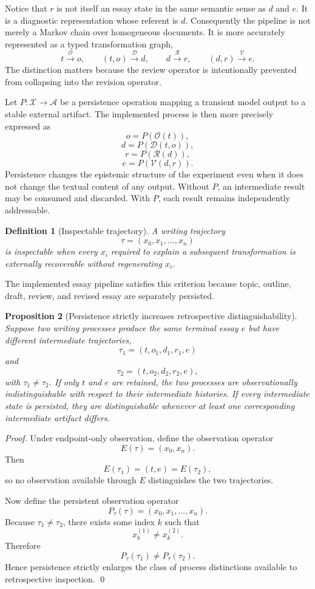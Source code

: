 \documentclass[11pt]{article}
\newtheorem{definition}{Definition}[section]
\newtheorem{proposition}[definition]{Proposition}
\newcommand{\Draft}{\mathcal{D}}
\newcommand{\Review}{\mathcal{R}}
\newcommand{\Revise}{\mathcal{V}}
\newcommand{\Outline}{\mathcal{O}}
\newcommand{\Artifact}{\mathcal{A}}
\begin{document}
Notice that \(r\) is not itself an essay state in the same semantic sense as \(d\) and \(e\). It is a diagnostic representation whose referent is \(d\). Consequently the pipeline is not merely a Markov chain over homogeneous documents. It is more accurately represented as a typed transformation graph,
\[
t \xrightarrow{\Outline} o,
\qquad
(t,o)\xrightarrow{\Draft}d,
\qquad
d\xrightarrow{\Review}r,
\qquad
(d,r)\xrightarrow{\Revise}e.
\]
The distinction matters because the review operator is intentionally prevented from collapsing into the revision operator.

Let \(P:\mathcal{X}\rightarrow\Artifact\) be a persistence operation mapping a transient model output to a stable external artifact. The implemented process is then more precisely expressed as
\[
    o=P(\Outline(t)),
\]
\[
    d=P(\Draft(t,o)),
\]
\[
    r=P(\Review(d)),
\]
\[
    e=P(\Revise(d,r)).
\]
Persistence changes the epistemic structure of the experiment even when it does not change the textual content of any output. Without \(P\), an intermediate result may be consumed and discarded. With \(P\), each result remains independently addressable.

\begin{definition}[Inspectable trajectory]
A writing trajectory
\[
    \tau=(x_0,x_1,\ldots,x_n)
\]
is \emph{inspectable} when every \(x_i\) required to explain a subsequent transformation is externally recoverable without regenerating \(x_i\).
\end{definition}

The implemented essay pipeline satisfies this criterion because topic, outline, draft, review, and revised essay are separately persisted.

\begin{proposition}[Persistence strictly increases retrospective distinguishability]
Suppose two writing processes produce the same terminal essay \(e\) but have different intermediate trajectories,
\[
    \tau_1=(t,o_1,d_1,r_1,e)
\]
and
\[
    \tau_2=(t,o_2,d_2,r_2,e),
\]
with \(\tau_1\neq\tau_2\). If only \(t\) and \(e\) are retained, the two processes are observationally indistinguishable with respect to their intermediate histories. If every intermediate state is persisted, they are distinguishable whenever at least one corresponding intermediate artifact differs.
\end{proposition}

\begin{proof}
Under endpoint-only observation, define the observation operator
\[
    E(\tau)=(x_0,x_n).
\]
Then
\[
    E(\tau_1)=(t,e)=E(\tau_2),
\]
so no observation available through \(E\) distinguishes the two trajectories.

Now define the persistent observation operator
\[
    P_{\tau}(\tau)=(x_0,x_1,\ldots,x_n).
\]
Because \(\tau_1\neq\tau_2\), there exists some index \(k\) such that
\[
    x_k^{(1)}\neq x_k^{(2)}.
\]
Therefore
\[
    P_{\tau}(\tau_1)\neq P_{\tau}(\tau_2).
\]
Hence persistence strictly enlarges the class of process distinctions available to retrospective inspection. \qed
\end{proof}
\end{document}
